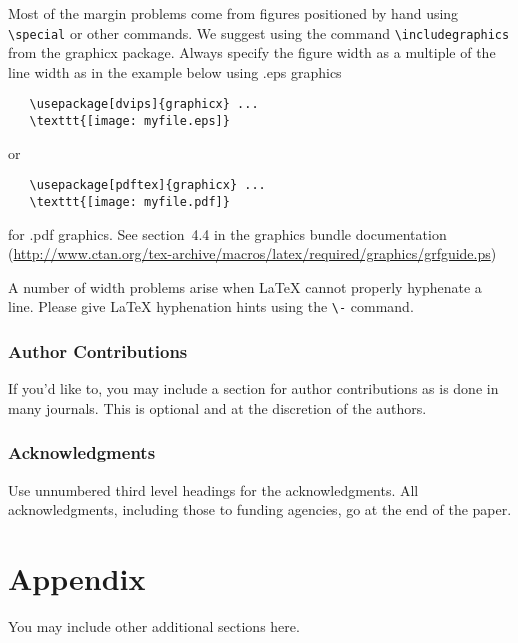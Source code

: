 \documentclass{article} %
\begin{document}
Most of the margin problems come from figures positioned by hand using
\verb+\special+ or other commands. We suggest using the command
\verb+\includegraphics+
from the graphicx package. Always specify the figure width as a multiple of
the line width as in the example below using .eps graphics
\begin{verbatim}
   \usepackage[dvips]{graphicx} ...
   \texttt{[image: myfile.eps]}
\end{verbatim}
or %
\begin{verbatim}
   \usepackage[pdftex]{graphicx} ...
   \texttt{[image: myfile.pdf]}
\end{verbatim}
for .pdf graphics.
See section~4.4 in the graphics bundle documentation (\url{http://www.ctan.org/tex-archive/macros/latex/required/graphics/grfguide.ps})

A number of width problems arise when LaTeX cannot properly hyphenate a
line. Please give LaTeX hyphenation hints using the \verb+\-+ command.

\subsubsection*{Author Contributions}
If you'd like to, you may include  a section for author contributions as is done
in many journals. This is optional and at the discretion of the authors.

\subsubsection*{Acknowledgments}
Use unnumbered third level headings for the acknowledgments. All
acknowledgments, including those to funding agencies, go at the end of the paper.





\appendix
\section{Appendix}
You may include other additional sections here.
\end{document}
